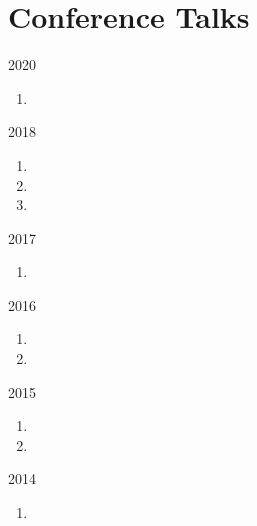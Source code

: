 \section*{Conference Talks}

\begin{paracol}{2}
  \textsc{2020}
\switchcolumn
  \begin{enumerate}
    \setcounter{enumi}{\thepubcounter}
    \item {}
    \setcounter{pubcounter}{\theenumi}
  \end{enumerate}
\end{paracol}

\begin{paracol}{2}
  \textsc{2018}
\switchcolumn
  \begin{enumerate}
    \setcounter{enumi}{\thepubcounter}
    \item {}
    \item {}
    \item {}
    \setcounter{pubcounter}{\theenumi}
  \end{enumerate}
\end{paracol}

\begin{paracol}{2}
  \textsc{2017}
\switchcolumn
  \begin{enumerate}
    \setcounter{enumi}{\thepubcounter}
    \item {}
    \setcounter{pubcounter}{\theenumi}
  \end{enumerate}
\end{paracol}

\begin{paracol}{2}
  \textsc{2016}
\switchcolumn
  \begin{enumerate}
    \setcounter{enumi}{\thepubcounter}
    \item {}
    \item {}
    \setcounter{pubcounter}{\theenumi}
  \end{enumerate}
\end{paracol}

\begin{paracol}{2}
  \textsc{2015}
\switchcolumn
  \begin{enumerate}
    \setcounter{enumi}{\thepubcounter}
    \item {}
    \item {}
    \setcounter{pubcounter}{\theenumi}
  \end{enumerate}
\end{paracol}

\begin{paracol}{2}
  \textsc{2014}
\switchcolumn
  \begin{enumerate}
    \setcounter{enumi}{\thepubcounter}
    \item {}
    \setcounter{pubcounter}{\theenumi}
  \end{enumerate}
\end{paracol}